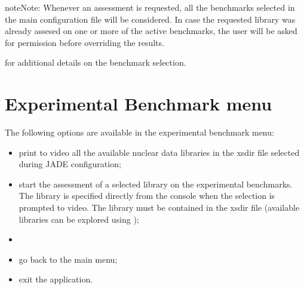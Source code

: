 \documentclass[letterpaper,10pt,english]{sphinxmanual}
\let\sphinxpxdimen\pdfpxdimen\else\newdimen\sphinxpxdimen
\begin{document}
\begin{sphinxadmonition}{note}{Note:}
\sphinxAtStartPar
Whenever an assessment is requested, all the benchmarks selected in the main configuration file will be considered.
In case the requested library was already assesed on one or more of the active benchmarks,
the user will be asked for permission before overriding the results.
\end{sphinxadmonition}


\nopagebreak


\sphinxAtStartPar
{\hyperref[\detokenize{usage/configuration:config}]{}} for additional details on the benchmark selection.




\section{Experimental Benchmark menu}
\label{\detokenize{usage/menu:experimental-benchmark-menu}}\label{\detokenize{usage/menu:expmenu}}
\noindent\sphinxincludegraphics[width=400\sphinxpxdimen]{{expmenu}.png}

\sphinxAtStartPar
The following options are available in the experimental benchmark menu:
\begin{itemize}
\item {} 
\sphinxAtStartPar
{} print to video all the available nuclear data libraries
in the xsdir file selected during JADE configuration;

\item {} 
\sphinxAtStartPar
{} start the assessment of a selected library on the experimental benchmarks. The library is
specified directly from the console when the selection is prompted to
video. The library must be contained in the xsdir file (available libraries
can be explored using );

\item {} 
\sphinxAtStartPar
{} 

\item {} 
\sphinxAtStartPar
{} go back to the main menu;

\item {} 
\sphinxAtStartPar
{} exit the application.

\end{itemize}
\end{document}
